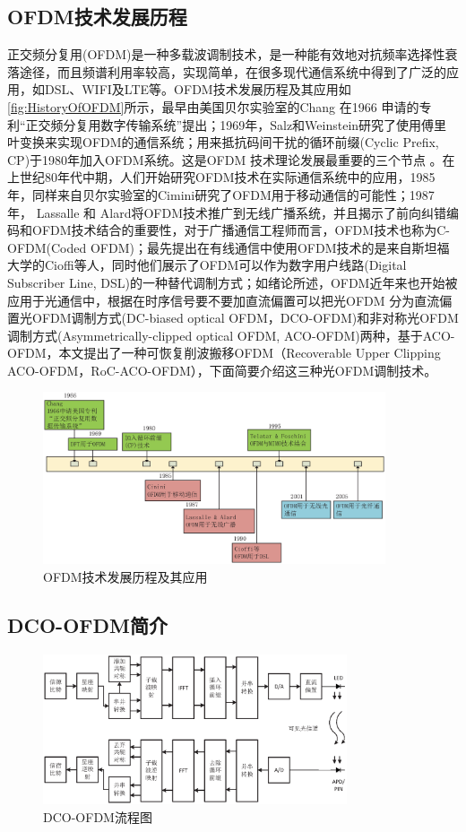 \subsection{OFDM技术发展历程}
正交频分复用(OFDM)是一种多载波调制技术，是一种能有效地对抗频率选择性衰落途径，而且频谱利用率较高，实现简单，在很多现代通信系统中得到了广泛的应用，如DSL、WIFI及LTE等。OFDM技术发展历程及其应用如
\autoref{fig:HistoryOfOFDM}所示，最早由美国贝尔实验室的Chang 在1966 申请的专利“正交频分复用数字传输系统”提出；1969年，Salz和Weinstein研究了使用傅里叶变换来实现OFDM的通信系统；用来抵抗码间干扰的循环前缀(Cyclic Prefix, CP)于1980年加入OFDM系统。这是OFDM 技术理论发展最重要的三个节点
\cite{armstrong2009ofdm}。在上世纪80年代中期，人们开始研究OFDM技术在实际通信系统中的应用，1985年，同样来自贝尔实验室的Cimini研究了OFDM用于移动通信的可能性；1987年， Lassalle 和 Alard将OFDM技术推广到无线广播系统，并且揭示了前向纠错编码和OFDM技术结合的重要性，对于广播通信工程师而言，OFDM技术也称为C-OFDM(Coded OFDM)；最先提出在有线通信中使用OFDM技术的是来自斯坦福大学的Cioffi等人，同时他们展示了OFDM可以作为数字用户线路(Digital Subscriber Line, DSL)的一种替代调制方式；如绪论所述，OFDM近年来也开始被应用于光通信中，根据在时序信号要不要加直流偏置可以把光OFDM 分为直流偏置光OFDM调制方式(DC-biased optical OFDM，DCO-OFDM)和非对称光OFDM调制方式(Asymmetrically-clipped optical OFDM, ACO-OFDM)两种，基于ACO-OFDM，本文提出了一种可恢复削波搬移OFDM（Recoverable Upper Clipping ACO-OFDM，RoC-ACO-OFDM），下面简要介绍这三种光OFDM调制技术。
\begin{figure}[htbp]
    \centering
    \includegraphics[width=0.9\textwidth]{figures/chapter-2/HistoryOfOFDM.eps}
    \caption{OFDM技术发展历程及其应用}
    \label{fig:HistoryOfOFDM}
\end{figure}
\subsection{DCO-OFDM简介}
\begin{figure}[htbp]
    \centering
    \includegraphics[width=0.8\textwidth]{figures/chapter-2/DCO-OFDMStructure.eps}
    \caption{DCO-OFDM流程图}
    \label{fig:DCO-OFDMStructure}
\end{figure}

